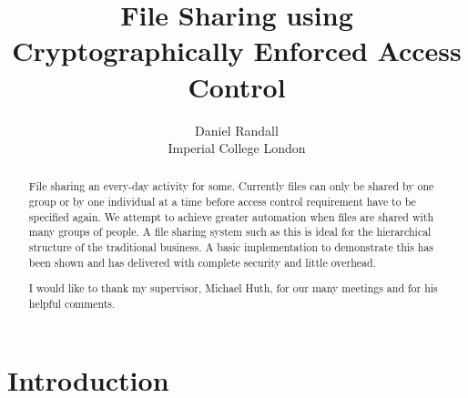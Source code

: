 \documentclass[12pt, titlepage]{article}
\title{File Sharing using Cryptographically Enforced Access Control}
\author{Daniel Randall \\ Imperial College London}
\date{}
\begin{document}
\maketitle

\begin{abstract}
File sharing an every-day activity for some. Currently files can only be shared by one group or by one individual at a time before access control requirement have to be specified again. We attempt to achieve greater automation when files are shared with many groups of people. A file sharing system such as this is ideal for the hierarchical structure of the traditional business. A basic implementation to demonstrate this has been shown and has delivered with complete security and little overhead.
\end{abstract}

\renewcommand{\abstractname}{Acknowledgements}
\begin{abstract}
I would like to thank my supervisor, Michael Huth, for our many meetings and for his helpful comments.
\end{abstract}


\newpage
\tableofcontents
\newpage

\newcommand{\defeq}{\stackrel{\textup{\tiny def}}{=}}

\section{Introduction}
\end{document}

